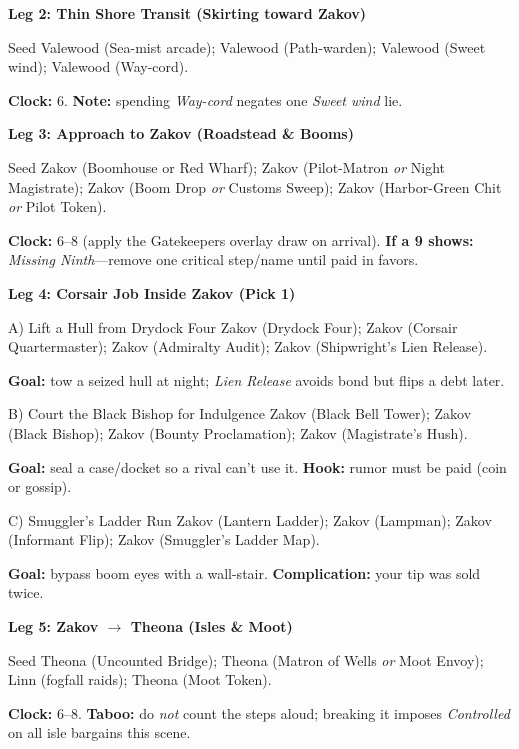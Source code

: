 \documentclass[11pt,letterpaper,twoside]{book}
\begin{document}
\textbf{Leg 2: Thin Shore Transit (Skirting toward Zakov)}
\begin{Leg}{Seed}
Valewood \SuitSpade{} (Sea-mist arcade);
Valewood \SuitHeart{} (Path-warden);
Valewood \SuitClub{} (Sweet wind);
Valewood \SuitDiamond{} (Way-cord).
\end{Leg}
\textbf{Clock:} 6. \textbf{Note:} spending \emph{Way-cord} negates one \emph{Sweet wind} lie.

\textbf{Leg 3: Approach to Zakov (Roadstead \& Booms)}
\begin{Leg}{Seed}
Zakov \SuitSpade{} (Boomhouse or Red Wharf);
Zakov \SuitHeart{} (Pilot-Matron \emph{or} Night Magistrate);
Zakov \SuitClub{} (Boom Drop \emph{or} Customs Sweep);
Zakov \SuitDiamond{} (Harbor-Green Chit \emph{or} Pilot Token).
\end{Leg}
\textbf{Clock:} 6--8 (apply the Gatekeepers overlay draw on arrival). \textbf{If a 9 shows:} \emph{Missing Ninth}---remove one critical step/name until paid in favors.

\textbf{Leg 4: Corsair Job Inside Zakov (Pick 1)}
\begin{Leg}{A) Lift a Hull from Drydock Four}
Zakov \SuitSpade{} (Drydock Four);
Zakov \SuitHeart{} (Corsair Quartermaster);
Zakov \SuitClub{} (Admiralty Audit);
Zakov \SuitDiamond{} (Shipwright's Lien Release).
\end{Leg}
\textbf{Goal:} tow a seized hull at night; \emph{Lien Release} avoids bond but flips a debt later.

\begin{Leg}{B) Court the Black Bishop for Indulgence}
Zakov \SuitSpade{} (Black Bell Tower);
Zakov \SuitHeart{} (Black Bishop);
Zakov \SuitClub{} (Bounty Proclamation);
Zakov \SuitDiamond{} (Magistrate's Hush).
\end{Leg}
\textbf{Goal:} seal a case/docket so a rival can't use it. \textbf{Hook:} rumor must be paid (coin or gossip).

\begin{Leg}{C) Smuggler's Ladder Run}
Zakov \SuitSpade{} (Lantern Ladder);
Zakov \SuitHeart{} (Lampman);
Zakov \SuitClub{} (Informant Flip);
Zakov \SuitDiamond{} (Smuggler's Ladder Map).
\end{Leg}
\textbf{Goal:} bypass boom eyes with a wall-stair. \textbf{Complication:} your tip was sold twice.

\textbf{Leg 5: Zakov $\rightarrow$ Theona (Isles \& Moot)}
\begin{Leg}{Seed}
Theona \SuitSpade{} (Uncounted Bridge);
Theona \SuitHeart{} (Matron of Wells \emph{or} Moot Envoy);
Linn \SuitClub{} (fogfall raids);
Theona \SuitDiamond{} (Moot Token).
\end{Leg}
\textbf{Clock:} 6--8. \textbf{Taboo:} do \emph{not} count the steps aloud; breaking it imposes \emph{Controlled} on all isle bargains this scene.
\end{document}
